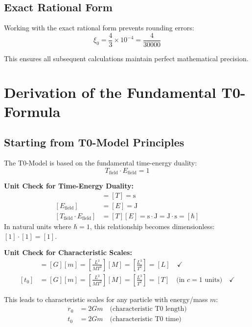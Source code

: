 \documentclass[12pt,a4paper]{article}
\theoremstyle{definition}
\begin{document}
	\subsection{Exact Rational Form}
	
	Working with the exact rational form prevents rounding errors:
	\begin{equation}
		\xi_0 = \frac{4}{3} \times 10^{-4} = \frac{4}{30000}
	\end{equation}
	
	This ensures all subsequent calculations maintain perfect mathematical precision.
	
	\section{Derivation of the Fundamental T0-Formula}
	
	\subsection{Starting from T0-Model Principles}
	
	The T0-Model is based on the fundamental time-energy duality:
	\begin{equation}
		T_{\text{field}} \cdot E_{\text{field}} = 1
	\end{equation}
	
	{\footnotesize
		\textbf{Unit Check for Time-Energy Duality:}
		\begin{align}
			[T_{\text{field}}] &= [T] = \text{s} \\
			[E_{\text{field}}] &= [E] = \text{J} \\
			[T_{\text{field}} \cdot E_{\text{field}}] &= [T][E] = \text{s} \cdot \text{J} = \text{J}\cdot\text{s} = [\hbar]
		\end{align}
		In natural units where $\hbar = 1$, this relationship becomes dimensionless: $[1] \cdot [1] = [1]$.
		
		\textbf{Unit Check for Characteristic Scales:}
		\begin{align}
			[r_0] &= [G][m] = \left[\frac{L^3}{MT^2}\right][M] = \left[\frac{L^3}{T^2}\right] = [L] \quad \checkmark \\
			[t_0] &= [G][m] = \left[\frac{L^3}{MT^2}\right][M] = \left[\frac{L^3}{T^2}\right] = [T] \quad \text{(in } c=1 \text{ units)} \quad \checkmark
		\end{align}
	}
	
	This leads to characteristic scales for any particle with energy/mass $m$:
	\begin{align}
		r_0 &= 2Gm \quad \text{(characteristic T0 length)} \\
		t_0 &= 2Gm \quad \text{(characteristic T0 time)}
	\end{align}
	
\end{document}
